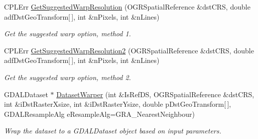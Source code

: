 \begin{DoxyCompactItemize}
CPLErr \hyperlink{classAbstractDataset_a339c58a6e439d0877d8b09e1d2d26b31}{GetSuggestedWarpResolution} (OGRSpatialReference \&dstCRS, double adfDstGeoTransform\mbox{[}$\,$\mbox{]}, int \&nPixels, int \&nLines)
\begin{DoxyCompactList}\small\item\em Get the suggested warp option, method 1. \end{DoxyCompactList}\item 
CPLErr \hyperlink{classAbstractDataset_aed58e61df99fd00c205fafef519639ee}{GetSuggestedWarpResolution2} (OGRSpatialReference \&dstCRS, double adfDstGeoTransform\mbox{[}$\,$\mbox{]}, int \&nPixels, int \&nLines)
\begin{DoxyCompactList}\small\item\em Get the suggested warp option, method 2. \end{DoxyCompactList}\item 
GDALDataset $\ast$ \hyperlink{classAbstractDataset_a55257132908f4fa578f44b1bb485dcaa}{DatasetWarper} (int \&IsRefDS, OGRSpatialReference \&dstCRS, int \&iDstRasterXsize, int \&iDstRasterYsize, double pDstGeoTransform\mbox{[}$\,$\mbox{]}, GDALResampleAlg eResampleAlg=GRA\_\-NearestNeighbour)
\begin{DoxyCompactList}\small\item\em Wrap the dataset to a GDALDataset object based on input parameters. \end{DoxyCompactList}\end{DoxyCompactItemize}
